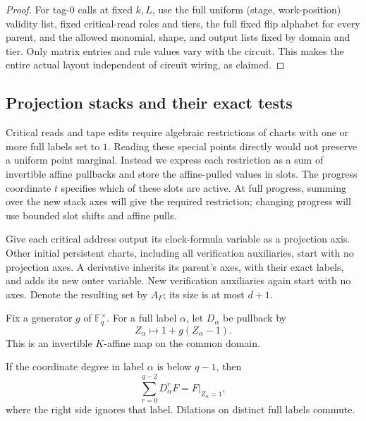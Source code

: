 \begin{proof}
For tag-$0$ calls at fixed $k,L$, use the full uniform
(stage, work-position) validity list, fixed critical-read roles and
tiers, the full fixed flip alphabet for every parent, and the
allowed monomial, shape, and output lists fixed by domain and tier.
Only matrix entries and rule values vary with the circuit.  This
makes the entire actual layout independent of circuit wiring, as
claimed.
\end{proof}
\subsection{Projection stacks and their exact tests}\label{ia:projection-stacks}

Critical reads and tape edits require algebraic restrictions of charts
with one or more full labels set to $1$.  Reading these special points
directly would not preserve a uniform point marginal.  Instead we
express each restriction as a sum of invertible affine pullbacks and
store the affine-pulled values in slots.  The progress coordinate $t$
specifies which of these slots are active.  At full progress, summing
over the new stack axes will give the required restriction; changing
progress will use bounded slot shifts and affine pulls.

Give each critical address output its clock-formula variable as a
projection axis.  Other initial persistent charts, including all
verification auxiliaries, start with no projection axes.  A derivative
inherits its parent's axes, with their exact labels, and adds its new
outer variable.  New verification auxiliaries again start with no
axes.  Denote the resulting set by $A_F$; its size is at most $d+1$.

Fix a generator $g$ of $\mathbb F_q^\times$.  For a full label
$\alpha$, let $D_\alpha$ be pullback by
\begin{equation}
 Z_\alpha\longmapsto 1+g(Z_\alpha-1).              \label{ia:dilation}
\end{equation}
This is an invertible $K$-affine map on the common domain.

\begin{lemma}\label{ia:projection}
If the coordinate degree in label $\alpha$ is below $q-1$, then
\begin{equation}
 \sum_{r=0}^{q-2}D_\alpha^r F
       =F\big|_{Z_\alpha=1},                      \label{ia:projection-identity}
\end{equation}
where the right side ignores that label.  Dilations on distinct
full labels commute.
\end{lemma}


